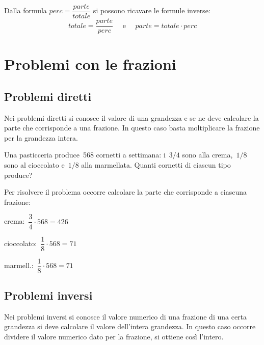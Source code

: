 Dalla formula \(perc = \dfrac{parte}{totale}\) si possono ricavare le 
formule inverse: 
\[totale = \dfrac{parte}{perc} \quad \text{ e } \quad 
  parte = totale \cdot perc\]


\section{Problemi con le frazioni}
\label{sec:razionali_problemi}


\subsection{Problemi diretti}
Nei problemi diretti si conosce il valore di una grandezza e se ne deve 
calcolare la parte che corrisponde a una frazione. 
In questo caso basta moltiplicare la frazione per la grandezza intera.

 \begin{esempio}{}{}
Una pasticceria produce~568 cornetti a settimana: i~\(3/4\) sono alla 
crema,~\(1/8\) sono al cioccolato e~\(1/8\) alla marmellata. 
Quanti cornetti di ciascun tipo produce?

Per risolvere il problema occorre calcolare la parte che corrisponde a 
ciascuna frazione:

\begin{multicols}{3}
\begin{itemize*}
\item crema:~\(\dfrac{3}{4}\cdot 568 =426\)
\item cioccolato:~\(\dfrac{1}{8}\cdot 568 =71\)
\item marmell.:~\(\dfrac{1}{8}\cdot 568 =71\)
\end{itemize*}
\end{multicols}
 \end{esempio}

\subsection{Problemi inversi}

Nei problemi inversi si conosce il valore numerico di una frazione di una 
certa grandezza si deve calcolare il valore dell'intera grandezza.
In questo caso occorre dividere il valore numerico dato per la frazione, 
si ottiene così l'intero.

